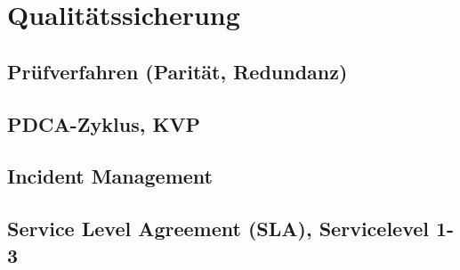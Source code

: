 \section{Qualitätssicherung}
\label{sec:Qualitätssicherung}

\subsection{Prüfverfahren (Parität, Redundanz)}
\label{sec:Pruefverfahren}

\subsection{PDCA-Zyklus, KVP}
\label{sec:PDCA-ZyklusKVP}

\subsection{Incident Management}
\label{sec:IncidentManagement}

\subsection{Service Level Agreement (SLA), Servicelevel 1-3}
\label{sec:ServiceLevelAgreement}






